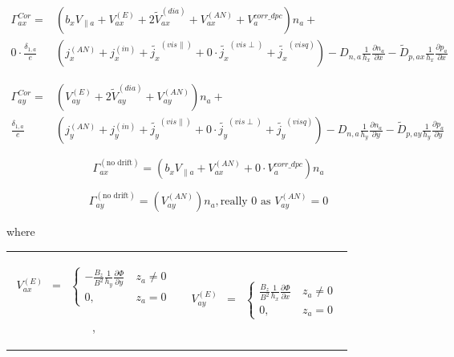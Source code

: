 \documentclass[a4paper,10pt]{report}
\begin{document}
\begin{equation}
\begin{matrix}
\Gamma_{ax}^{Cor} =& \left( b_x V_{\parallel a} + V_{ax}^{\left( E \right)} + 2 \widetilde{V}_{ax}^{\left( dia \right)} + V_{ax}^{\left( AN \right)} + V_a^{corr\_dpc} \right) n_a + \\
0 \cdot \frac{\delta_{1,a}}{e} & \left( j_x^{\left( AN \right)} + j_x^{\left( in \right)} + \widetilde{j_x}^{\left( vis \parallel \right)} + 0 \cdot \widetilde{j_x}^{\left( vis \perp \right)} + \widetilde{j_x}^{\left( visq \right)} \right) - D_{n,a} \frac{1}{h_x} \frac{\partial n_a}{\partial x} - \widetilde{D}_{p,ax} \frac{1}{h_x} \frac{\partial p_a}{\partial x}
\end{matrix}
\end{equation}

\begin{equation}
\begin{matrix}
\Gamma_{ay}^{Cor} =& \left( V_{ay}^{\left( E \right)} + 2 \widetilde{V}_{ay}^{\left( dia \right)} + V_{ay}^{\left( AN \right)} \right) n_a + \\
\frac{\delta_{1,a}}{e} & \left( j_y^{\left( AN \right)} + j_y^{\left( in \right)} + \widetilde{j_y}^{\left( vis \parallel \right)} + 0 \cdot \widetilde{j_y}^{\left( vis \perp \right)} + \widetilde{j_y}^{\left( visq \right)} \right) - D_{n,a} \frac{1}{h_y} \frac{\partial n_a}{\partial y} - \widetilde{D}_{p,ay} \frac{1}{h_y} \frac{\partial p_a}{\partial y}
\end{matrix}
\end{equation}

\begin{equation}
\Gamma_{ax}^{ \left( \text{no drift} \right)} = \left( b_x V_{\parallel a} + V_{ax}^{\left( AN \right)} + 0 \cdot V_a^{corr\_dpc} \right) n_a
\end{equation}

\begin{equation}
\Gamma_{ay}^{ \left( \text{no drift} \right)} = \left( V_{ay}^{\left( AN \right)} \right) n_a, \text{really 0 as } V_{ay}^{\left( AN \right)} = 0
\end{equation}

\noindent where
\begin{tabular}{cc}
$\begin{matrix}
V_{ax}^{(E)} & =
& \left\{
\begin{matrix}
-\frac{B_z}{B^2} \frac{1}{h_y} \frac{\partial \Phi}{\partial y} & \ z_a \neq 0 \\
0, & \ z_a = 0
\end{matrix} \right.
\end{matrix}$

,&

$\begin{matrix}
V_{ay}^{(E)} & =
& \left\{
\begin{matrix}
\frac{B_z}{B^2} \frac{1}{h_x} \frac{\partial \Phi}{\partial x} & \ z_a \neq 0 \\
0, & \ z_a = 0
\end{matrix} \right.
\end{matrix}$
\end{tabular}
\end{document}
